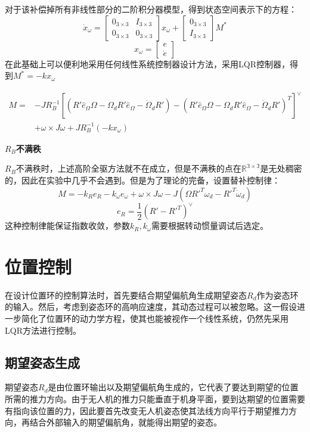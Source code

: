     对于该补偿掉所有非线性部分的二阶积分器模型，得到状态空间表示下的方程：
    $$\dot x_\omega=\begin{bmatrix}
        0_{3\times 3} & I_{3\times 3} \\
        0_{3\times 3} & 0_{3\times 3}
    \end{bmatrix} x_\omega+\begin{bmatrix}
        0_{3\times 3} \\ I_{3\times 3}
    \end{bmatrix} M^* $$
    $$x_\omega=\begin{bmatrix}
        e \\ \dot e
    \end{bmatrix}$$
    在此基础上可以便利地采用任何线性系统控制器设计方法，采用LQR控制器，得到$M^*=-kx_\omega$

   $$ \begin{aligned}
        M=&-J R_B^{-1} [(R' \hat e_\Omega \Omega  -\Omega_d R' \hat e_\Omega -\dot \Omega_d R')-(R' \hat e_\Omega \Omega  -\Omega_d R' \hat e_\Omega -\dot \Omega_d R')^T]^\vee \\
         &+\omega \times J\omega + J R_B^{-1}(-kx_\omega)
    \end{aligned}$$

    \textbf{$R_B$不满秩}

    $R_B$不满秩时，上述高阶全驱方法就不在成立，但是不满秩的点在$\mathbb{R^{3 \times 3}}$是无处稠密的，因此在实验中几乎不会遇到。但是为了理论的完备，设置替补控制律\cite{Lee2010}：
    $$M=-k_R e_R-k_\omega e_\omega+\omega \times J \omega -J(\Omega R'^T \omega_d-R'^T \dot \omega_d) $$
    $$ e_R=\frac{1}{2} (R'-R'^T)^\vee $$
    这种控制律能保证指数收敛，参数$k_R,k_\omega$需要根据转动惯量调试后选定。
    \section{位置控制}
    在设计位置环的控制算法时，首先要结合期望偏航角生成期望姿态$R_d$作为姿态环的输入。然后，考虑到姿态环的高响应速度，其动态过程可以被忽略。这一假设进一步简化了位置环的动力学方程，使其也能被视作一个线性系统，仍然先采用LQR方法进行控制。

    
    \subsection{期望姿态生成}
    期望姿态$R_d$是由位置环输出以及期望偏航角生成的，它代表了要达到期望的位置所需的推力方向。由于无人机的推力只能垂直于机身平面，要到达期望的位置需要有指向该位置的力，因此要首先改变无人机姿态使其法线方向平行于期望推力方向，再结合外部输入的期望偏航角，就能得出期望的姿态\cite{Lee2010}。

